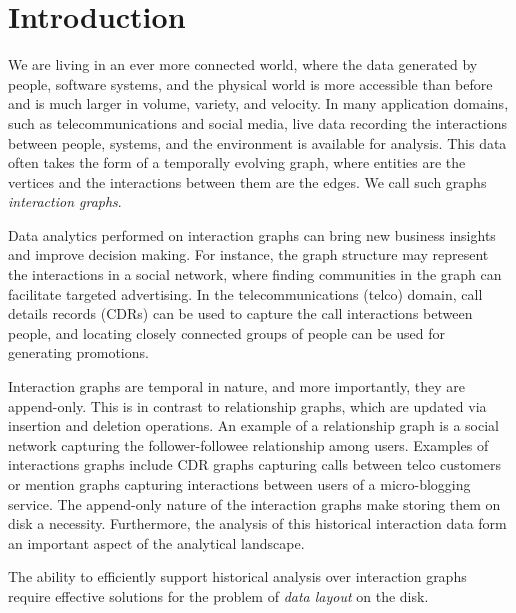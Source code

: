 \section{Introduction}\label{sec:introduction}

We are living in an ever more connected world, where the data generated by
people, software systems, and the physical world is more accessible than
before and is much larger in volume, variety, and velocity. In many
application domains, such as telecommunications and social media, live data
recording the interactions between people, systems, and the environment is
available for analysis. This data often takes the form of a temporally
evolving graph, where entities are the vertices and the interactions between
them are the edges. We call such graphs \emph{interaction graphs}. 

Data analytics performed on interaction graphs can bring new business insights
and improve decision making. For instance, the graph structure may represent
the interactions in a social network, where finding communities in the graph
can facilitate targeted advertising. In the telecommunications (telco) domain,
call details records (CDRs) can be used to capture the call interactions
between people, and locating closely connected groups of people can be used
for generating promotions. 

Interaction graphs are temporal in nature, and more importantly, they are
append-only. This is in contrast to relationship graphs, which are updated via
insertion and deletion operations. An example of a relationship graph is a
social network capturing the follower-followee relationship among users.
Examples of interactions graphs include CDR graphs capturing calls between
telco customers or mention graphs capturing interactions between users of a
micro-blogging service. The append-only nature of the interaction graphs make
storing them on disk a necessity. Furthermore, the analysis of this historical
interaction data form an important aspect of the analytical landscape.

The ability to efficiently support historical analysis over interaction graphs
require effective solutions for the problem of \emph{data layout} on the disk.



